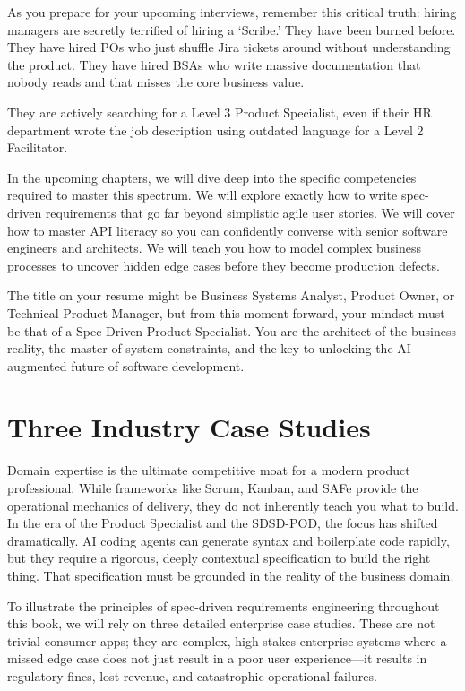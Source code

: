 As you prepare for your upcoming interviews, remember this critical
truth: hiring managers are secretly terrified of hiring a `Scribe.' They
have been burned before. They have hired POs who just shuffle Jira
tickets around without understanding the product. They have hired BSAs
who write massive documentation that nobody reads and that misses the
core business value.

They are actively searching for a Level 3 Product Specialist, even if
their HR department wrote the job description using outdated language
for a Level 2 Facilitator.

In the upcoming chapters, we will dive deep into the specific
competencies required to master this spectrum. We will explore exactly
how to write spec-driven requirements that go far beyond simplistic
agile user stories. We will cover how to master API literacy so you can
confidently converse with senior software engineers and architects. We
will teach you how to model complex business processes to uncover hidden
edge cases before they become production defects.

The title on your resume might be Business Systems Analyst, Product
Owner, or Technical Product Manager, but from this moment forward, your
mindset must be that of a Spec-Driven Product Specialist. You are the
architect of the business reality, the master of system constraints, and
the key to unlocking the AI-augmented future of software development.

\chapter{Three Industry Case Studies}\label{three-industry-case-studies}

Domain expertise is the ultimate competitive moat for a modern product
professional. While frameworks like Scrum, Kanban, and SAFe provide the
operational mechanics of delivery, they do not inherently teach you what
to build. In the era of the Product Specialist and the SDSD-POD, the
focus has shifted dramatically. AI coding agents can generate syntax and
boilerplate code rapidly, but they require a rigorous, deeply contextual
specification to build the right thing. That specification must be
grounded in the reality of the business domain.

To illustrate the principles of spec-driven requirements engineering
throughout this book, we will rely on three detailed enterprise case
studies. These are not trivial consumer apps; they are complex,
high-stakes enterprise systems where a missed edge case does not just
result in a poor user experience---it results in regulatory fines, lost
revenue, and catastrophic operational failures.

